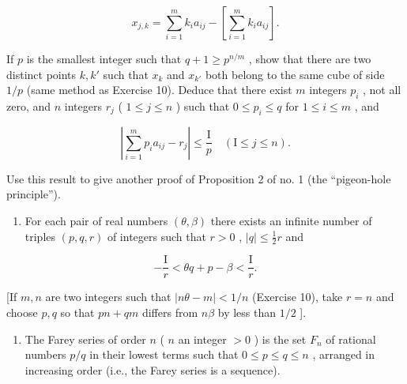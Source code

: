 \[
x _ {j, k} = \sum_ {i = 1} ^ {m} k _ {i} a _ {i j} - \left[ \sum_ {i = 1} ^ {m} k _ {i} a _ {i j} \right].
\]

If \(p\) is the smallest integer such that \(q + 1 \geqslant p^{n/m}\) , show that there are two distinct points \(k, k'\) such that \(x_k\) and \(x_{k'}\) both belong to the same cube of side \(1/p\) (same method as Exercise 10). Deduce that there exist \(m\) integers \(p_i\) , not all zero, and \(n\) integers \(r_j\) ( \(1 \leqslant j \leqslant n\) ) such that \(0 \leqslant p_i \leqslant q\) for \(1 \leqslant i \leqslant m\) , and

\[
\left| \sum_ {i = 1} ^ {m} p _ {i} a _ {i j} - r _ {j} \right| \leqslant \frac {\mathrm{I}}{p} \quad (\mathrm{I} \leqslant j \leqslant n).
\]

Use this result to give another proof of Proposition 2 of no. 1 (the ``pigeon-hole principle'').

\begin{enumerate}
\def\labelenumi{\arabic{enumi})}
\setcounter{enumi}{11}
\tightlist
\item
  For each pair of real numbers \((\theta, \beta)\) there exists an infinite number of triples \((p, q, r)\) of integers such that \(r > 0\) , \(|q| \leqslant \frac{1}{2} r\) and
\end{enumerate}

\[
- \frac {\mathrm{I}}{r} <   \theta q + p - \beta <   \frac {\mathrm{I}}{r}.
\]

{[}If \(m, n\) are two integers such that \(|n\theta - m| < 1/n\) (Exercise 10), take \(r = n\) and choose \(p, q\) so that \(pn + qm\) differs from \(n\beta\) by less than \(1/2\) {]}.

\begin{enumerate}
\def\labelenumi{\arabic{enumi})}
\setcounter{enumi}{12}
\tightlist
\item
  The Farey series of order \(n\) ( \(n\) an integer \(>0\) ) is the set \(F_n\) of rational numbers \(p/q\) in their lowest terms such that \(0 \leqslant p \leqslant q \leqslant n\) , arranged in increasing order (i.e., the Farey series is a sequence).
\end{enumerate}

